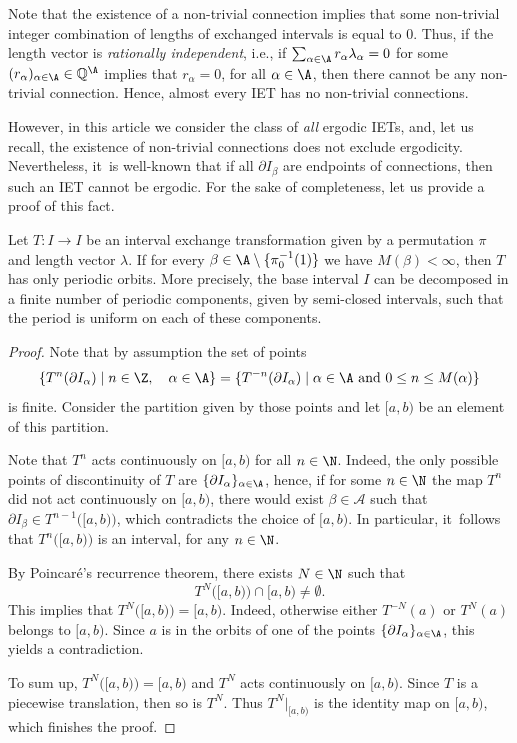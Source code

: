 Note that the existence of a non-trivial connection implies that some
non-trivial integer combination of lengths of exchanged intervals is equal to
$0$. Thus, if the length vector is \emph{rationally independent}, i.e., if
$\sum_{\alpha\in\A}r_{\alpha}\lambda_\alpha=0$ for some $(r_{\alpha})_{\alpha
\in \A} \in\mathbb Q^{\A}$ implies that $r_{\alpha}=0$, for all $\alpha\in\A$,
then there cannot be any non-trivial connection. Hence, almost every IET has no non-trivial
connections.

However, in this article we consider the class of \emph{all} ergodic IETs, and, let us recall, the existence of non-trivial connections does not exclude ergodicity. Nevertheless, it~is well-known that if all $\partial I_{\beta}$ are endpoints of connections, then such an IET cannot be ergodic. For the sake of completeness, let us provide a proof of this fact.

\begin{lemma}\label{lem: notallconnections}
Let $T:I\to I$ be an interval exchange transformation given by a permutation $\pi$ and length vector $\lambda$. If for every $\beta\in \A\setminus \{\pi_0^{-1}(1)\}$ we have $M(\beta)<\infty$, then $T$ has only periodic orbits. {More precisely, the base interval $I$ can be decomposed in a finite number of periodic components, given by semi-closed intervals, such that the period is uniform on each of these components.}
\end{lemma}

\begin{proof}
Note that by assumption the set of points
\[
\{T^{n}(\partial I_{\alpha})\mid n\in\Z,\quad\alpha\in \A\}=\{T^{-n}(\partial I_{\alpha})\mid \alpha\in\A\text{ and } 0\le n\le M(\alpha)\}
\]
is finite. Consider the partition given by those points and let $[a,b)$ be an element of this partition.

Note that $T^n$ acts continuously on $[a,b)$ for all $n\in\N$. Indeed, the only possible points of discontinuity of $T$ are $\{\partial I_{\alpha}\}_{\alpha\in\A}$, hence, if for some $n\in\N$ the map $T^n$ did not act continuously on $[a,b)$, there would exist $\beta\in\mathcal A$ such that $\partial I_{\beta}\in T^{n-1}\big([a,b)\big)$, which contradicts the choice of $[a,b)$. In particular, it~follows that $T^n\big([a,b)\big)$ is an interval, for any $n \in \N$.

By Poincaré's recurrence theorem, there exists $N\in\N$ such that
\[
T^{N}\big([a,b)\big)\cap [a,b)\neq \emptyset.
\]
This implies that $T^{N}\big([a,b)\big)=[a,b)$. Indeed, otherwise either $T^{-N}(a)$ or $T^{N}(a)$ belongs to $[a,b)$. Since $a$ is in the orbits of one of the points $\{\partial I_{\alpha}\}_{\alpha\in\A}$, this yields a contradiction.

To sum up, $T^{N}\big([a,b)\big)=[a,b)$ and $T^N$ acts continuously on $[a,b)$. Since $T$ is a piecewise translation, then so is $T^N$. Thus $T^N|_{[a,b)}$ is the identity map on $[a,b)$, which finishes the proof.
\end{proof}

